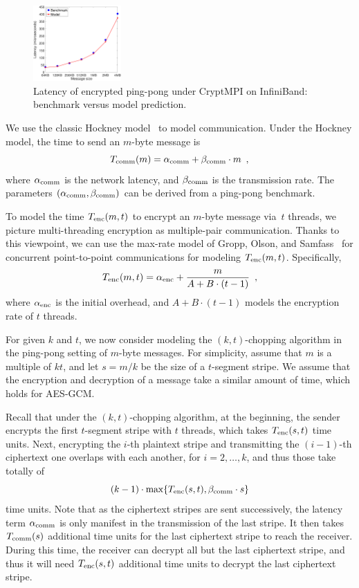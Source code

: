 \begin{figure}[t]
	\centering
	\vspace{-2.5ex}
		\includegraphics[width=0.3\textwidth]{graphs/model-valid.eps}
		\vspace{-1ex}
	\caption{Latency of encrypted ping-pong under CryptMPI on InfiniBand: benchmark versus model prediction. }
		\vspace{-0.5ex}
	\label{fig:model-valid}
	\vspace{-2.5ex}
\end{figure}


We use the classic Hockney model~\cite{Hockney94} to model
communication. Under the Hockney model, the time to send an $m$-byte message is
\[
T_{\mathrm{comm}}(m) = \alpha_{\mathrm{comm}} + \beta_{\mathrm{comm}} \cdot m \enspace,
\]
where $\alpha_{\mathrm{comm}}$ is the network latency, and $\beta_{\mathrm{comm}}$ is the transmission rate.
The parameters $(\alpha_{\mathrm{comm}},\beta_{\mathrm{comm}})$ can be derived from a ping-pong benchmark.

To model the time $T_{\mathrm{enc}}(m, t)$ to encrypt an $m$-byte message via~$t$ threads, we picture multi-threading encryption as multiple-pair
communication. Thanks to this viewpoint, 
we can use the max-rate model of Gropp, Olson, and Samfass~\cite{gropp2016modeling} for concurrent point-to-point communications
for modeling $T_{\mathrm{enc}}(m, t)$. Specifically, 
\[
T_{\mathrm{enc}}(m, t) = \alpha_{\mathrm{enc}} + \dfrac{m}{A+B\cdot (t-1)} \enspace,
\]
where $\alpha_{\mathrm{enc}}$ is the initial overhead, and $A + B \cdot (t - 1)$
models the encryption rate of $t$ threads. 

For given $k$ and $t$, we now consider modeling the
$(k, t)$-chopping algorithm in the ping-pong setting of $m$-byte messages. 
For simplicity, assume that $m$ is a multiple
of $kt$, and let $s = m / k$ be the size of a $t$-segment stripe. 
We assume that the encryption
and decryption of a message take a similar amount of time, which holds for AES-GCM. 

Recall that under the $(k, t)$-chopping algorithm, 
at the beginning, the sender encrypts the first  $t$-segment stripe with $t$ threads,
which takes $T_{\mathrm{enc}}(s, t)$ time units. Next, encrypting the $i$-th plaintext stripe
and transmitting the $(i-1)$-th  ciphertext one overlaps with each another,
for $i = 2, \ldots, k$, 
and thus those take totally of  
\[ (k - 1)  \cdot \max\{ T_{\mathrm{enc}}(s, t), \beta_{\mathrm{comm}} \cdot s \}  \] 
time units. Note that as the ciphertext stripes are sent successively,
the latency term  $\alpha_{\mathrm{comm}}$ is only manifest in the transmission of the
last stripe. 
It then takes $T_{\mathrm{comm}}(s)$ additional time units for the
last ciphertext  stripe to reach the receiver. 
During this time, the receiver can decrypt all but the last ciphertext stripe, 
and thus it will need $T_{\mathrm{enc}}(s, t)$ additional time units to decrypt the
last ciphertext stripe.


